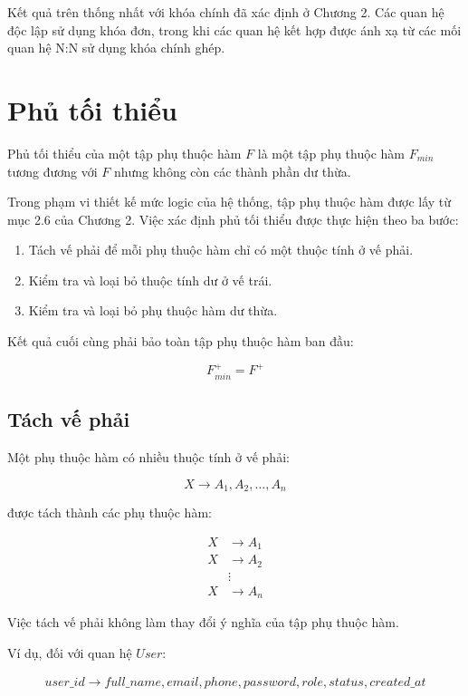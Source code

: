 Kết quả trên thống nhất với khóa chính đã xác định ở Chương 2. Các quan hệ
độc lập sử dụng khóa đơn, trong khi các quan hệ kết hợp được ánh xạ từ các
mối quan hệ N:N sử dụng khóa chính ghép.

\section{Phủ tối thiểu}

Phủ tối thiểu của một tập phụ thuộc hàm $F$ là một tập phụ thuộc hàm
$F_{min}$ tương đương với $F$ nhưng không còn các thành phần dư thừa.

Trong phạm vi thiết kế mức logic của hệ thống, tập phụ thuộc hàm được lấy từ
mục 2.6 của Chương 2. Việc xác định phủ tối thiểu được thực hiện theo ba
bước:

\begin{enumerate}
	\item Tách vế phải để mỗi phụ thuộc hàm chỉ có một thuộc tính ở vế phải.
	\item Kiểm tra và loại bỏ thuộc tính dư ở vế trái.
	\item Kiểm tra và loại bỏ phụ thuộc hàm dư thừa.
\end{enumerate}

Kết quả cuối cùng phải bảo toàn tập phụ thuộc hàm ban đầu:

\[
F_{min}^{+}=F^{+}
\]

\subsection{Tách vế phải}

Một phụ thuộc hàm có nhiều thuộc tính ở vế phải:

\[
X \rightarrow A_1,A_2,\ldots,A_n
\]

được tách thành các phụ thuộc hàm:

\[
\begin{aligned}
	X &\rightarrow A_1\\
	X &\rightarrow A_2\\
	&\vdots\\
	X &\rightarrow A_n
\end{aligned}
\]

Việc tách vế phải không làm thay đổi ý nghĩa của tập phụ thuộc hàm.

Ví dụ, đối với quan hệ $User$:

\[
\begin{aligned}
	user\_id \rightarrow
	full\_name,email,phone,password,role,status,created\_at
\end{aligned}
\]

